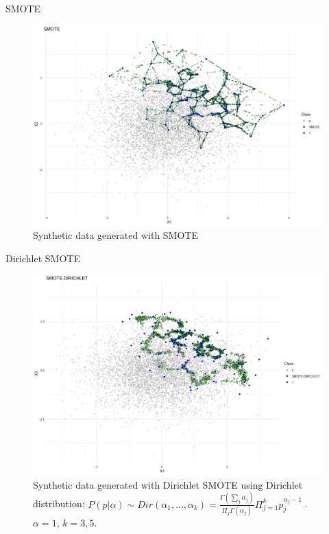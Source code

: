 \documentclass{beamer}
\begin{document}



\begin{frame}{SMOTE}
  \begin{figure}
      \centering
      \includegraphics[width=0.8\linewidth]{figures/smote.png}
      \caption{Synthetic data generated with SMOTE}
      \label{fig:label1}
  \end{figure}
\end{frame}



\begin{frame}{Dirichlet SMOTE}
  \begin{figure}
      \centering
      \includegraphics[width=0.7\linewidth]{figures/dirichlet.png}
      \caption{Synthetic data generated with Dirichlet SMOTE using Dirichlet distribution: $P(p|\alpha) \sim Dir(\alpha_1, ... , \alpha_k) = \frac{\Gamma(\sum_j \alpha_j )}{\Pi_j \Gamma(\alpha_j)} \Pi_{j = 1}^{k} p_j^{\alpha_j -1}$ \cite{matharaarachchi2024enhancing}. $\alpha = 1$, $k = 3,5$.}
      \label{fig:label2}
  \end{figure}    
\end{frame}
\end{document}

